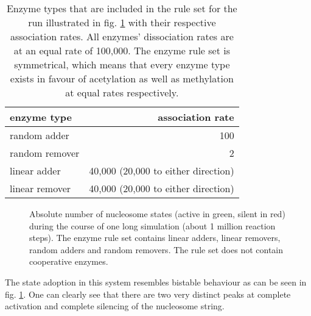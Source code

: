             \begin{table}[htbp!]
                \caption{Enzyme types that are included in the rule set for the run illustrated in fig. \ref{img:outlook_nonCoop} with their respective association rates. All enzymes' dissociation rates are at an equal rate of 100,000. The enzyme rule set is symmetrical, which means that every enzyme type exists in favour of acetylation as well as methylation at equal rates respectively.}
                \begin{center}
                    \begin{tabular}{l r}
                        \hline
                        \textbf{enzyme type} & \textbf{association rate} \\
                        \hline
                        random adder & 100 \\
                        random remover & 2 \\
                        linear adder & 40,000 (20,000 to either direction)\\
                        linear remover & 40,000 (20,000 to either direction)\\
                        \hline
                    \end{tabular}
                \end{center}
                \label{img:enzymeRatesPeculiarCase}
            \end{table}

            \begin{figure}[htpb!]
                \centering
                \caption{Absolute number of nucleosome states (active in green, silent in red) during the course of one long simulation (about 1 million reaction steps). The enzyme rule set contains linear adders, linear removers, random adders and random removers. The rule set does not contain cooperative enzymes.}
                \label{img:outlook_nonCoop}
            \end{figure}

            The state adoption in this system resembles bistable behaviour as can be seen in fig. \ref{img:outlook_nonCoop}. One can clearly see that there are two very distinct peaks at complete activation and complete silencing of the nucleosome string.

